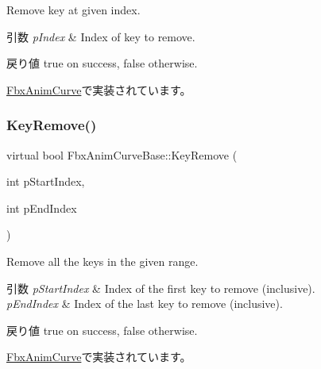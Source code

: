 Remove key at given index. 
\begin{DoxyParams}{引数}
{\em p\+Index} & Index of key to remove. \\
\hline
\end{DoxyParams}
\begin{DoxyReturn}{戻り値}
{\ttfamily true} on success, {\ttfamily false} otherwise. 
\end{DoxyReturn}


\hyperlink{class_fbx_anim_curve_a083206eda111aa4c6803410427a4645c}{Fbx\+Anim\+Curve}で実装されています。

\mbox{\label{class_fbx_anim_curve_base_a2813321af80c66758eb9fbe025fd52ea}} 
\subsubsection{\texorpdfstring{Key\+Remove()}{KeyRemove()}\hspace{0.1cm}{\footnotesize\ttfamily [2/2]}}
{\footnotesize\ttfamily virtual bool Fbx\+Anim\+Curve\+Base\+::\+Key\+Remove (\begin{DoxyParamCaption}\item[{int}]{p\+Start\+Index,  }\item[{int}]{p\+End\+Index }\end{DoxyParamCaption})\hspace{0.3cm}{\ttfamily [pure virtual]}}

Remove all the keys in the given range. 
\begin{DoxyParams}{引数}
{\em p\+Start\+Index} & Index of the first key to remove (inclusive). \\
\hline
{\em p\+End\+Index} & Index of the last key to remove (inclusive). \\
\hline
\end{DoxyParams}
\begin{DoxyReturn}{戻り値}
{\ttfamily true} on success, {\ttfamily false} otherwise. 
\end{DoxyReturn}


\hyperlink{class_fbx_anim_curve_a7b4fe494d1ca4575bb253ec89f867df1}{Fbx\+Anim\+Curve}で実装されています。

\mbox{\label{class_fbx_anim_curve_base_a1a66d683a6013b5eb41d128dcbbccd4a}} 
